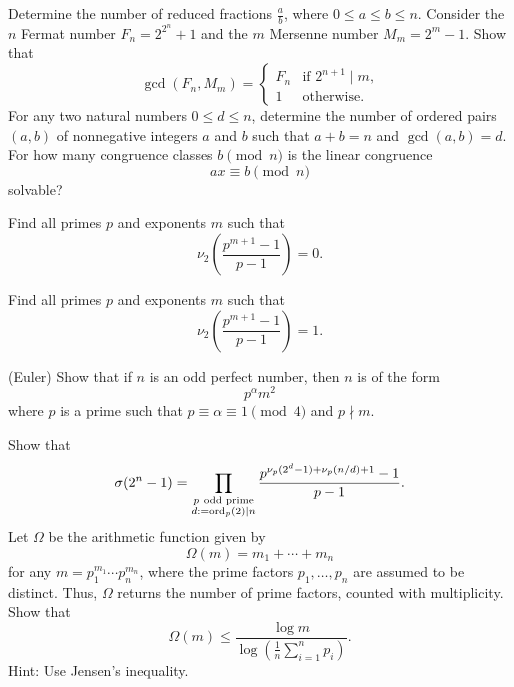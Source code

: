 \begin{challenge}
  \exercise Determine the number of reduced fractions $\tfrac{a}{b}$, where $0\leq a\leq b\leq n$.
  \exercise Consider the $n$\supth{} Fermat number $F_n=2^{2^n}+1$ and the $m$\supth{} Mersenne number $M_m=2^m-1$. Show that
  \begin{equation*}
    \gcd(F_n,M_m)=
    \begin{cases}
      F_n & \text{if $2^{n+1}\mid m$,}\\
      1 & \text{otherwise.}
    \end{cases}
  \end{equation*}
  \exercise For any two natural numbers $0\leq d\leq n$, determine the number of ordered pairs $(a,b)$ of nonnegative integers $a$ and $b$ such that $a+b=n$ and $\gcd(a,b)=d$.
  \exercise For how many congruence classes $b \pmod{n}$ is the linear congruence
  \begin{equation*}
    ax\equiv b\pmod{n}
  \end{equation*}
  solvable?
  \exercise
  \begin{subexenum}
  \item Find all primes $p$ and exponents $m$ such that
    \begin{equation*}
      \nu_2\left(\frac{p^{m+1}-1}{p-1}\right)=0.
    \end{equation*}
  \item Find all primes $p$ and exponents $m$ such that
    \begin{equation*}
      \nu_2\left(\frac{p^{m+1}-1}{p-1}\right)=1.
    \end{equation*}
  \item (Euler) Show that if $n$ is an odd perfect number, then $n$ is of the form
    \begin{equation*}
      p^{\alpha}m^2
    \end{equation*}
    where $p$ is a prime such that $p\equiv \alpha \equiv 1\pmod{4}$ and $p\nmid m$.
  \end{subexenum}
  \exercise Show that
  \begin{equation*}
    \sigma(2^n-1) = \prod_{\substack{p~\text{odd prime}\\d:=\operatorname{ord}_p(2)\mid n}}\frac{p^{\nu_p(2^d-1)+\nu_p(n/d)+1}-1}{p-1}.
  \end{equation*}
  \exercise Let $\Omega$ be the arithmetic function given by
  \begin{equation*}
    \Omega(m)=m_1+\cdots+m_n
  \end{equation*}
  for any $m=p_1^{m_1}\cdots p_n^{m_n}$, where the prime factors $p_1,\ldots,p_n$ are assumed to be distinct. Thus, $\Omega$ returns the number of prime factors, counted with multiplicity. Show that
  \[
    \Omega(m)\leq
    \frac{\log m}{\log \left(\frac{1}{n}\sum_{i=1}^n p_i\right)}.
  \]
  Hint: Use Jensen's inequality.
\end{challenge}


